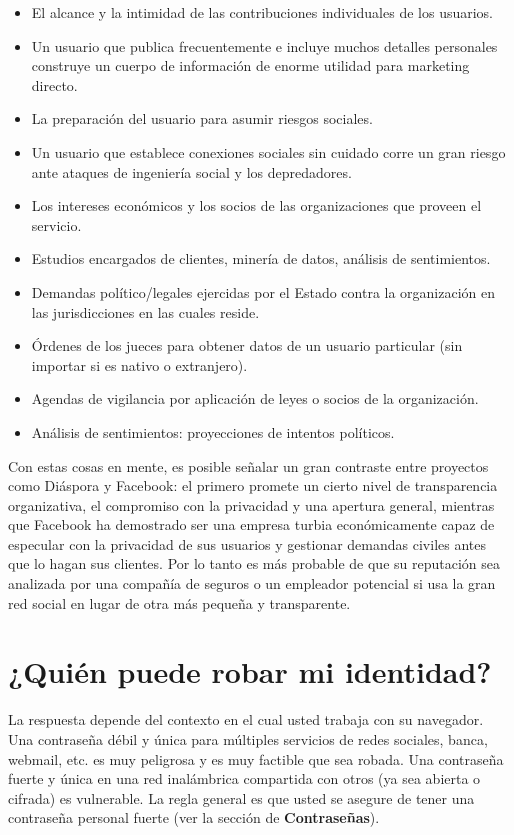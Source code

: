 \documentclass[10pt,a5paper,twoside,,]{book}
\begin{document}
\begin{itemize}
\item
  El alcance y la intimidad de las contribuciones individuales de los
  usuarios.
\item
  Un usuario que publica frecuentemente e incluye muchos detalles
  personales construye un cuerpo de información de enorme utilidad para
  marketing directo.
\item
  La preparación del usuario para asumir riesgos sociales.
\item
  Un usuario que establece conexiones sociales sin cuidado corre un gran
  riesgo ante ataques de ingeniería social y los depredadores.
\item
  Los intereses económicos y los socios de las organizaciones que
  proveen el servicio.
\item
  Estudios encargados de clientes, minería de datos, análisis de
  sentimientos.
\item
  Demandas político/legales ejercidas por el Estado contra la
  organización en las jurisdicciones en las cuales reside.
\item
  Órdenes de los jueces para obtener datos de un usuario particular (sin
  importar si es nativo o extranjero).
\item
  Agendas de vigilancia por aplicación de leyes o socios de la
  organización.
\item
  Análisis de sentimientos: proyecciones de intentos políticos.
\end{itemize}

Con estas cosas en mente, es posible señalar un gran contraste entre
proyectos como Diáspora y Facebook: el primero promete un cierto nivel
de transparencia organizativa, el compromiso con la privacidad y una
apertura general, mientras que Facebook ha demostrado ser una empresa
turbia económicamente capaz de especular con la privacidad de sus
usuarios y gestionar demandas civiles antes que lo hagan sus clientes.
Por lo tanto es más probable de que su reputación sea analizada por una
compañía de seguros o un empleador potencial si usa la gran red social
en lugar de otra más pequeña y transparente.

\section{¿Quién puede robar mi
identidad?}\label{quiuxe9n-puede-robar-mi-identidad}

La respuesta depende del contexto en el cual usted trabaja con su
navegador. Una contraseña débil y única para múltiples servicios de
redes sociales, banca, webmail, etc. es muy peligrosa y es muy factible
que sea robada. Una contraseña fuerte y única en una red inalámbrica
compartida con otros (ya sea abierta o cifrada) es vulnerable. La regla
general es que usted se asegure de tener una contraseña personal fuerte
(ver la sección de \textbf{Contraseñas}).
\end{document}
